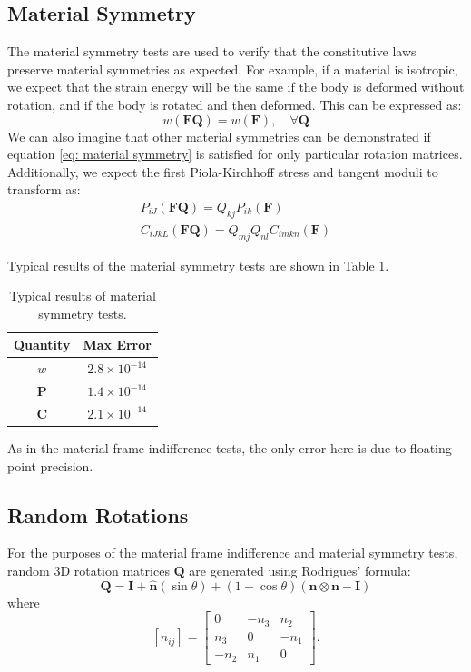 \documentclass[]{spie}  %
\newcommand\Tstrut{\rule{0pt}{2.6ex}}         %
\begin{document}
\subsection{Material Symmetry}
The material symmetry tests are used to verify that the constitutive laws preserve material symmetries as expected. For example, if a material is isotropic, we expect that the strain energy will be the same if the body is deformed without rotation, and if the body is rotated and then deformed. This can be expressed as:
\begin{equation}
\label{eq: material symmetry}
w(\bm{F}\bm{Q}) = w(\bm{F}) , \quad \forall \bm{Q}
\end{equation}
We can also imagine that other material symmetries can be demonstrated if equation \ref{eq: material symmetry} is satisfied for only particular rotation matrices. Additionally, we expect the first Piola-Kirchhoff stress and tangent moduli to transform as:
\begin{gather}
P_{iJ}(\bm{F}\bm{Q}) = Q_{kj}P_{ik}(\bm{F}) \\
C_{iJkL}(\bm{F}\bm{Q}) = Q_{mj}Q_{nl}C_{imkn}(\bm{F})
\end{gather}

Typical results of the material symmetry tests are shown in Table \ref{table: material symmetry}. 
\begin{table}[h]
	\centering
	\caption{Typical results of material symmetry tests.}
	\begin{tabular}{ | c | c | }
		\hline
		Quantity & Max Error \Tstrut \\ \hline
		$w$ 		& $2.8 \times 10^{-14}$ \Tstrut \\
		$\bm{P}$ 	& $1.4 \times 10^{-14}$ \\
		$\bm{C}$ 	& $2.1 \times 10^{-14}$ \\
		\hline
	\end{tabular}
	\label{table: material symmetry}
\end{table}

As in the material frame indifference tests, the only error here is due to floating point precision. 

\subsection{Random Rotations}
For the purposes of the material frame indifference and material symmetry tests, random 3D rotation matrices $\bm{Q}$ are generated using Rodrigues' formula:
\begin{equation}
\label{eq: random rotation}
\bm{Q} = \bm{I} + \bm{\hat{n}}(\sin\theta)  + (1 - \cos\theta)(\bm{n} \otimes \bm{n} - \bm{I})
\end{equation}
where
\begin{equation}
\left[\hat{n}_{ij}\right] = 
\begin{bmatrix}
0		&	-n_3	&	n_2 \\
n_3		&	0		&	-n_1 \\
-n_2	& 	n_1		& 0
\end{bmatrix} .
\end{equation}
\end{document}
